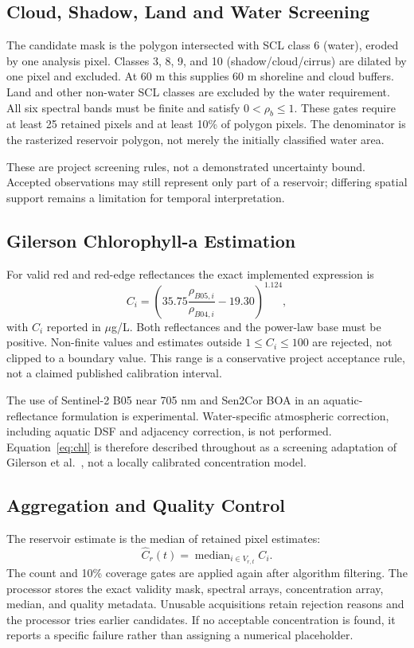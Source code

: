 \documentclass[conference]{IEEEtran}
\begin{document}
\subsection{Cloud, Shadow, Land and Water Screening}
The candidate mask is the polygon intersected with SCL class 6 (water), eroded by one analysis pixel. Classes 3, 8, 9, and 10 (shadow/cloud/cirrus) are dilated by one pixel and excluded. At 60 m this supplies 60 m shoreline and cloud buffers. Land and other non-water SCL classes are excluded by the water requirement. All six spectral bands must be finite and satisfy $0<\rho_b\leq1$. These gates require at least 25 retained pixels and at least 10\% of polygon pixels. The denominator is the rasterized reservoir polygon, not merely the initially classified water area.

These are project screening rules, not a demonstrated uncertainty bound. Accepted observations may still represent only part of a reservoir; differing spatial support remains a limitation for temporal interpretation.

\subsection{Gilerson Chlorophyll-a Estimation}
For valid red and red-edge reflectances the exact implemented expression is
\begin{equation}
C_i=\left(35.75\frac{\rho_{B05,i}}{\rho_{B04,i}}-19.30\right)^{1.124},\label{eq:chl}
\end{equation}
with $C_i$ reported in $\mu$g/L. Both reflectances and the power-law base must be positive. Non-finite values and estimates outside $1\leq C_i\leq100$ are rejected, not clipped to a boundary value. This range is a conservative project acceptance rule, not a claimed published calibration interval.

The use of Sentinel-2 B05 near 705 nm and Sen2Cor BOA in an aquatic-reflectance formulation is experimental. Water-specific atmospheric correction, including aquatic DSF and adjacency correction, is not performed. Equation~\eqref{eq:chl} is therefore described throughout as a screening adaptation of Gilerson et al.\ \cite{gilerson2010}, not a locally calibrated concentration model.

\subsection{Aggregation and Quality Control}
The reservoir estimate is the median of retained pixel estimates:
\begin{equation}
\widehat C_r(t)=\operatorname{median}_{i\in V_{r,t}} C_i.
\end{equation}
The count and 10\% coverage gates are applied again after algorithm filtering. The processor stores the exact validity mask, spectral arrays, concentration array, median, and quality metadata. Unusable acquisitions retain rejection reasons and the processor tries earlier candidates. If no acceptable concentration is found, it reports a specific failure rather than assigning a numerical placeholder.
\end{document}
